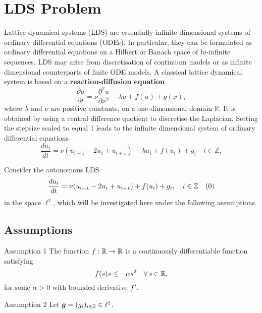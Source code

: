 \documentclass[11pt]{beamer}
\begin{document}
\section{LDS Problem}
\begin{frame}
    Lattice dynamical systems (LDS) are essentially infinite dimensional systems of ordinary differential equations (ODEs). In particular, they can be formulated as ordinary differential equations on a Hilbert or Banach space of bi-infinite sequences.
    LDS may arise from discretisation of continuum models or as infinite dimensional counterparts of finite ODE models.
    A classical lattice dynamical system is based on a \textbf{reaction-diffusion equation}
\[
\frac{\partial u}{\partial t}=\nu\frac{\partial^{2}u}{\partial x^{2}}-\lambda u+f(u)+g(x),
\]
where $\lambda$ and $\nu$ are positive constants, on a one-dimensional domain $\mathbb{R}$. It is obtained by using a central difference quotient to discretise the Laplacian. Setting the stepsize scaled to equal 1 leads to the infinite dimensional system of ordinary differential equations
\[
\frac{du_{i}}{dt}=\nu(u_{i-1}-2u_{i}+u_{i+1})-\lambda u_{i}+f(u_{i})+g_{i} \quad i\in\mathbb{Z},
\] 
\end{frame}
\begin{frame}
    Consider the autonomous LDS
    \[
    \frac{d\mathnormal{u_i}}{d\mathnormal{t}} = \mathnormal{\nu} (\mathnormal{u_{i-1}} - 2\mathnormal{u_i} + \mathnormal{u_{i+1}}) + \mathnormal{f}(\mathnormal{u_i}) + \mathnormal{g_i}, \quad \mathnormal{i} \in \mathbb{Z}\quad (0)
    \]
    in the space $\ell^2$, which will be investigated here under the following assumptions.
        
\end{frame}

\subsection{Assumptions}
\begin{frame}
    \begin{block}{Assumption 1}
        The function $\mathnormal{f} : \mathbb{R} \to \mathbb{R}$ is a continuously differentiable function satisfying
        \[
        \mathnormal{f(s)}\mathnormal{s} \leq -\alpha \mathnormal{s}^2 \quad \forall \, \mathnormal{s} \in \mathbb{R},
        \]
        for some $\alpha > 0$ with bounded derivative $\mathnormal{f'}$.


    \end{block}
        
    \begin{block}{Assumption 2}
    Let $\boldsymbol{g} = (\mathnormal{g_i})_{i \in \mathbb{Z}} \in \ell^2$.
    \end{block}
\end{frame}
\end{document}
